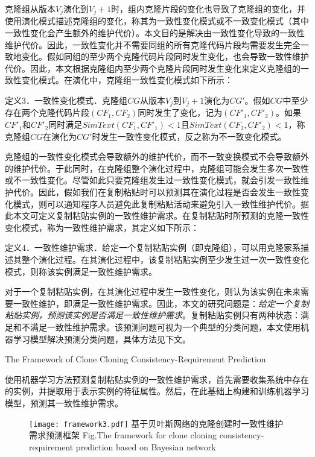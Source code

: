 克隆组从版本$V_j$演化到$V_j+1$时，组内克隆片段的变化也导致了克隆组的变化，并使用演化模式描述克隆组的变化，称其为一致性变化模式或不一致变化模式（其中一致性变化会产生额外的维护代价）。本文目的是解决由一致性变化导致的一致性维护代价。因此，一致性变化并不需要同组的所有克隆代码片段均需要发生完全一致地变化。假如同组的至少两个克隆代码片段同时发生变化，也会导致一致性维护代价。因此，本文根据克隆组内至少两个克隆片段同时发生变化来定义克隆组的一致性变化模式。在演化中，克隆组一致性变化模式如下所示：


定义3．一致性变化模式．克隆组$CG$从版本$V_j$到$V_j+1$演化为$CG'$。假如$CG$中至少存在两个克隆代码片段$(CF_1,CF_2)$同时发生了变化，记为$(CF'_1,CF'_2)$。如果$CF'_1$和$CF'_2$同时满足$SimText(CF_1,CF'_1)<1$且$SimText(CF_2,CF'_2)<1$，称克隆组$CG$在演化为$CG'$时发生一致性变化模式，反之称为不一致变化模式。


克隆组的一致性变化模式会导致额外的维护代价，而不一致变换模式不会导致额外的维护代价。于此同时，在克隆组整个演化过程中，克隆组可能会发生多次一致性或不一致性变化。尽管如此只要克隆组发生过一致性变化模式，就会引发一致性维护代价。因此，假如我们在复制粘贴时可以预测其在演化过程是否会发生一致性变化模式，则可以通知程序人员避免此复制粘贴活动来避免引入一致性维护代价。据此本文可定义复制粘贴实例的一致性维护需求。在复制粘贴时所预测的克隆一致性变化模式，称为一致性维护需求，其定义如下所示：


定义4．一致性维护需求．给定一个复制粘贴实例（即克隆组），可以用克隆家系描述其整个演化过程。在其演化过程中，该复制粘贴实例至少发生过一次一致性变化模式，则称该实例满足一致性维护需求。


对于一个复制粘贴实例，在其演化过程中发生一致性变化，则认为该实例在未来需要一致性维护，即满足一致性维护需求。因此，本文的研究问题是：{\em 给定一个复制粘贴实例，预测该实例是否满足一致性维护需求}。复制粘贴实例只有两种状态：满足和不满足一致性维护需求。该预测问题可视为一个典型的分类问题，本文使用机器学习模型解决预测分类问题，具体方法见下文。

{The Framework of Clone Cloning Consistency-Requirement Prediction }

使用机器学习方法预测复制粘贴实例的一致性维护需求，首先需要收集系统中存在的实例，并提取用于表示实例的特征属性。然后，在此基础上构建和训练机器学习模型，预测其一致性维护需求。

\begin{figure}[htbp]
\centering
\texttt{[image: framework3.pdf]}
\bicaption[framwork3]{}
{基于贝叶斯网络的克隆创建时一致性维护需求预测框架}
{Fig.$\!$}{The framework for clone cloning consistency-requirement prediction based on Bayesian network}
\vspace{-1em}
\end{figure}

